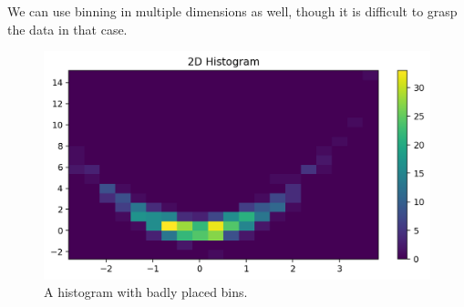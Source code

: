 \documentclass[a4paper, openany]{memoir}
\begin{document}
We can use binning in multiple dimensions as well, though it is difficult to grasp the data in that case.
\begin{figure}[H]
    \centering
    \includegraphics[scale=0.5]{src/2.29 2D Histogram.png}
    \caption{A histogram with badly placed bins.}
\end{figure}
\end{document}
